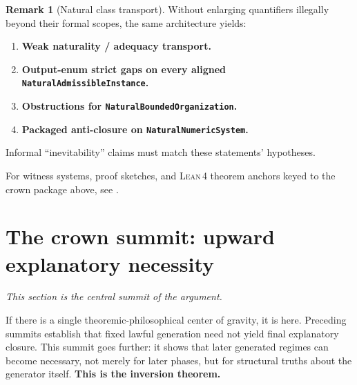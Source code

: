 \documentclass[11pt,a4paper]{article}
\theoremstyle{definition}
\newtheorem{remark}[theorem]{Remark}
\newcommand{\lean}{\textsc{Lean}\,4}
\begin{document}
\begin{remark}[Natural class transport]
Without enlarging quantifiers illegally beyond their formal scopes, the same architecture yields:
\begin{enumerate}[label=(\roman*),leftmargin=2.4em,itemsep=0.65em]
\item \textbf{Weak naturality / adequacy transport.}


\item \textbf{Output-enum strict gaps on every aligned \texttt{NaturalAdmissibleInstance}.}



\item \textbf{Obstructions for \texttt{NaturalBoundedOrganization}.}


\item \textbf{Packaged anti-closure on \texttt{NaturalNumericSystem}.}

\end{enumerate}
Informal ``inevitability'' claims must match these statements' hypotheses.
\end{remark}


\medskip
\noindent
For witness systems, proof sketches, and \lean{} theorem anchors keyed to the crown package above, see .

\section{The crown summit: upward explanatory necessity}\label{sec:upward-necessity}

\textit{This section is the central summit of the argument.}

If there is a single theoremic-philosophical center of gravity, it is here. Preceding summits establish that fixed lawful generation need not yield final explanatory closure. This summit goes further: it shows that later generated regimes can become necessary, not merely for later phases, but for structural truths about the generator itself. \textbf{This is the inversion theorem.}
\end{document}
